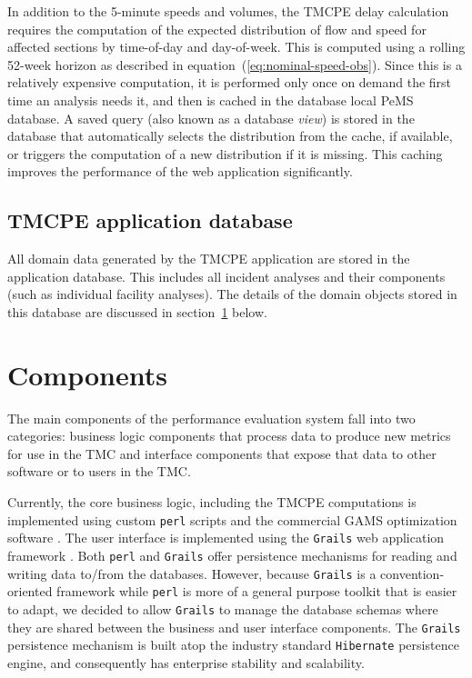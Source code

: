 \documentclass[12pt]{report}
\newcounter{time}
\begin{document}
In addition to the 5-minute speeds and volumes, the \ac{TMCPE} delay calculation
requires the computation of the expected distribution of flow and speed for
affected sections by time-of-day and day-of-week.  This is computed using a
rolling 52-week horizon as described in equation~(\ref{eq:nominal-speed-obs}).
Since this is a relatively expensive computation, it is performed only once on
demand the first time an analysis needs it, and then is cached in the database
local \ac{PeMS} database.  A saved query (also known as a database \emph{view})
is stored in the database that automatically selects the distribution from the
cache, if available, or triggers the computation of a new distribution if it is
missing.  This caching improves the performance of the web application
significantly.


\subsection{TMCPE application database}
\label{sec:tmcpe-app-database}

All domain data generated by the \ac{TMCPE} application are stored in the
application database.  This includes all incident analyses and their components
(such as individual facility analyses).  The details of the domain objects
stored in this database are discussed in section~\ref{sec:components} below.


\section{Components}
\label{sec:components}

The main components of the performance evaluation system fall into two
categories: business logic components that process data to produce new metrics
for use in the \ac{TMC} and interface components that expose that data to other
software or to users in the \ac{TMC}.  

Currently, the core business logic, including the \ac{TMCPE} computations is
implemented using custom \texttt{perl} scripts and the commercial \ac{GAMS}
optimization software \citep{rosenthal10:_gams}.  The user interface is
implemented using the \texttt{Grails} web application framework \citep{grails}.
Both \texttt{perl} and \texttt{Grails} offer persistence mechanisms for reading
and writing data to/from the databases.  However, because \texttt{Grails} is a
convention-oriented framework while \texttt{perl} is more of a general purpose
toolkit that is easier to adapt, we decided to allow \texttt{Grails} to manage
the database schemas where they are shared between the business and user
interface components.  The \texttt{Grails} persistence mechanism is built atop
the industry standard \texttt{Hibernate} persistence
\citep{king10:_hiber_relat_persis_idiom_java} engine, and consequently has
enterprise stability and scalability.
\end{document}
